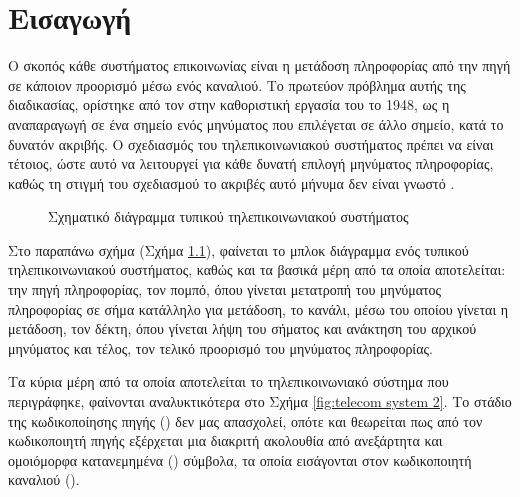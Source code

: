 \chapter{Εισαγωγή}
Ο σκοπός κάθε συστήματος επικοινωνίας είναι η μετάδοση πληροφορίας από την πηγή σε κάποιον προορισμό μέσω ενός καναλιού. Το πρωτεύον πρόβλημα αυτής της διαδικασίας, ορίστηκε από τον  στην καθοριστική εργασία του το 1948, ως η αναπαραγωγή σε ένα σημείο ενός μηνύματος που επιλέγεται σε άλλο σημείο, κατά το δυνατόν ακριβής. Ο σχεδιασμός του τηλεπικοινωνιακού συστήματος πρέπει να είναι τέτοιος, ώστε αυτό να λειτουργεί για κάθε δυνατή επιλογή μηνύματος πληροφορίας, καθώς τη στιγμή του σχεδιασμού το ακριβές αυτό μήνυμα δεν είναι γνωστό \cite{shannon1948mathematical}.

\begin{figure}[h]
\caption{Σχηματικό διάγραμμα τυπικού τηλεπικοινωνιακού συστήματος}
\label{fig:telecom system}
\end{figure}

Στο παραπάνω σχήμα (Σχήμα \ref{fig:telecom system}), φαίνεται το μπλοκ διάγραμμα ενός τυπικού τηλεπικοινωνιακού συστήματος, καθώς και τα βασικά μέρη από τα οποία αποτελείται: την πηγή πληροφορίας, τον πομπό, όπου γίνεται μετατροπή του μηνύματος πληροφορίας σε σήμα κατάλληλο για μετάδοση, το κανάλι, μέσω του οποίου γίνεται η μετάδοση, τον δέκτη, όπου γίνεται λήψη του σήματος και ανάκτηση του αρχικού μηνύματος και τέλος, τον τελικό προορισμό του μηνύματος πληροφορίας.

Tα κύρια μέρη από τα οποία αποτελείται το τηλεπικοινωνιακό σύστημα που περιγράφηκε, φαίνονται αναλυκτικότερα στο Σχήμα \ref{fig:telecom system 2}. Tο στάδιο της κωδικοποίησης πηγής () δεν μας απασχολεί, οπότε και θεωρείται πως από τον κωδικοποιητή πηγής εξέρχεται μια διακριτή ακολουθία από ανεξάρτητα και ομοιόμορφα κατανεμημένα () σύμβολα, τα οποία εισάγονται στον κωδικοποιητή καναλιού ().


